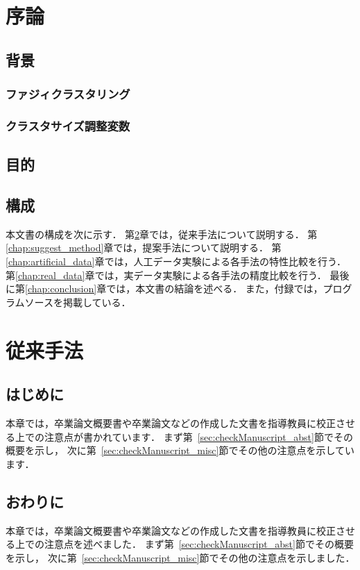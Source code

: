 \documentclass[a4j,12pt,dvipdfmx,oneside]{jsbook}
\theoremstyle{definition}
\begin{document}
\pagestyle{headings}
\def\thepage{\roman{page}}

\tableofcontents
\listoffigures
\listoftables
\newpage
\pagestyle{myheadings}
%
%
%
\chapter{序論}
\def\thepage{\arabic{page}}
\setcounter{page}{1}
\label{chap:first}
%
\section{背景}\label{sec:background}
%
\subsection{ファジィクラスタリング}\label{subsec:fuzzy_clustering}
%
\subsection{クラスタサイズ調整変数}\label{subsec:cluster_adjust_var}
%
\section{目的}\label{sec:purpose}
%
\section{構成}\label{sec:contents}
本文書の構成を次に示す．
第\ref{chap:before_method}章では，従来手法について説明する．
第\ref{chap:suggest_method}章では，提案手法について説明する．
第\ref{chap:artificial_data}章では，人工データ実験による各手法の特性比較を行う．
第\ref{chap:real_data}章では，実データ実験による各手法の精度比較を行う．
最後に第\ref{chap:conclusion}章では，本文書の結論を述べる．
また，付録では，プログラムソースを掲載している．
%
%
%
\chapter{従来手法}\label{chap:before_method}
%
\section{はじめに}\label{sec:before_method_intro}
本章では，卒業論文概要書や卒業論文などの作成した文書を指導教員に校正させ
る上での注意点が書かれています．
まず第~\ref{sec:checkManuscript_abst}節でその概要を示し，
次に第~\ref{sec:checkManuscript_misc}節でその他の注意点を示しています．
%
\section{おわりに}\label{sec:before_method_summary}
本章では，卒業論文概要書や卒業論文などの作成した文書を指導教員に校正させ
る上での注意点を述べました．
まず第~\ref{sec:checkManuscript_abst}節でその概要を示し，
次に第~\ref{sec:checkManuscript_misc}節でその他の注意点を示しました．
%
%
%
\end{document}
